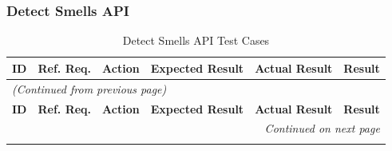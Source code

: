 \documentclass[12pt, titlepage]{article}
\begin{document}
\subsubsection{Detect Smells API}
\begin{longtable}{c
    >{\raggedright\arraybackslash}p{1.5cm}
    >{\raggedright\arraybackslash}p{5cm}
    >{\raggedright\arraybackslash}p{4cm}
    >{\raggedright\arraybackslash}p{3cm} c}
  \toprule
  \textbf{ID} & \textbf{Ref. Req.} & \textbf{Action} &
  \textbf{Expected Result} & \textbf{Actual Result} & \textbf{Result} \\
  \midrule
  \endfirsthead

  \multicolumn{6}{l}{\textit{(Continued from previous page)}} \\
  \toprule
  \textbf{ID} & \textbf{Ref. Req.} & \textbf{Action} &
  \textbf{Expected Result} & \textbf{Actual Result} & \textbf{Result} \\
  \midrule
  \endhead

  \multicolumn{6}{r}{\textit{Continued on next page}} \\
  \endfoot

  \bottomrule
  \caption{Detect Smells API Test Cases}
  \label{table:detect_smells_tests}
  \endlastfoot


\end{longtable}
\end{document}
